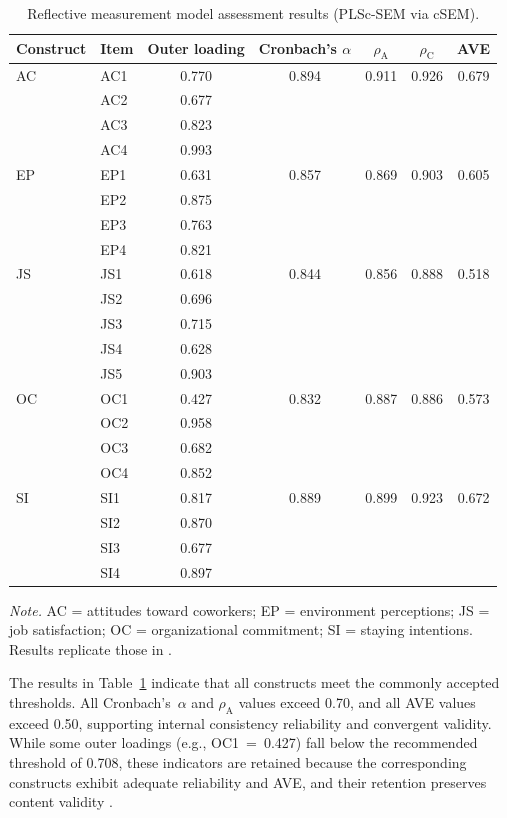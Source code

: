 \documentclass[12pt,a4paper]{article}\usepackage[]{graphicx}\usepackage[]{xcolor}
\newcommand{\pkg}[1]{\textsf{#1}}
\begin{document}
\begin{table}[htbp]
\centering
\caption{Reflective measurement model assessment results (PLSc-SEM via \pkg{cSEM}).}
\label{tab:measurement}
\small
\begin{tabular}{llccccc}
\toprule
Construct & Item & Outer loading & Cronbach's $\alpha$ & $\rho_\text{A}$ & $\rho_\text{C}$ & AVE \\
\midrule
AC & AC1 & 0.770 & 0.894 & 0.911 & 0.926 & 0.679 \\
   & AC2 & 0.677 & & & & \\
   & AC3 & 0.823 & & & & \\
   & AC4 & 0.993 & & & & \\[3pt]
EP & EP1 & 0.631 & 0.857 & 0.869 & 0.903 & 0.605 \\
   & EP2 & 0.875 & & & & \\
   & EP3 & 0.763 & & & & \\
   & EP4 & 0.821 & & & & \\[3pt]
JS & JS1 & 0.618 & 0.844 & 0.856 & 0.888 & 0.518 \\
   & JS2 & 0.696 & & & & \\
   & JS3 & 0.715 & & & & \\
   & JS4 & 0.628 & & & & \\
   & JS5 & 0.903 & & & & \\[3pt]
OC & OC1 & 0.427 & 0.832 & 0.887 & 0.886 & 0.573 \\
   & OC2 & 0.958 & & & & \\
   & OC3 & 0.682 & & & & \\
   & OC4 & 0.852 & & & & \\[3pt]
SI & SI1 & 0.817 & 0.889 & 0.899 & 0.923 & 0.672 \\
   & SI2 & 0.870 & & & & \\
   & SI3 & 0.677 & & & & \\
   & SI4 & 0.897 & & & & \\
\bottomrule
\end{tabular}

\smallskip
\footnotesize\textit{Note.} AC = attitudes toward coworkers; EP = environment perceptions; JS = job satisfaction; OC = organizational commitment; SI = staying intentions. Results replicate those in \citet[Table~1]{Cheah2026}.
\end{table}

The results in Table~\ref{tab:measurement} indicate that all constructs meet the commonly accepted thresholds. All Cronbach's~$\alpha$ and $\rho_\text{A}$ values exceed 0.70, and all AVE values exceed 0.50, supporting internal consistency reliability and convergent validity. While some outer loadings (e.g., OC1~=~0.427) fall below the recommended threshold of 0.708, these indicators are retained because the corresponding constructs exhibit adequate reliability and AVE, and their retention preserves content validity \citep{Hair2026primer}.
\end{document}
